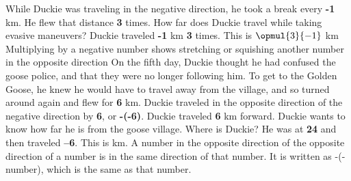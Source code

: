 {}
{While Duckie was traveling in the negative direction, he took a break every \textbf{-1} km. He flew that distance  \textbf{3} times. How far does Duckie travel while taking evasive maneuvers?}
{Duckie traveled \textbf{-1} km \textbf{3} times. This is $\opmul{3}{-1}$ km}
{Multiplying by a negative number shows stretching or squishing another number in the opposite direction}
{}
{On the fifth day, Duckie thought he had confused the goose police, and that they were no longer following him. To get to the Golden Goose, he knew he would have to travel away from the village, and so turned around again and flew for \textbf{6} km. Duckie traveled in the opposite direction of the negative direction by \textbf{6}, or \textbf{-(-6)}. Duckie traveled \textbf{6} km forward. Duckie wants to know how far he is from the goose village. Where is Duckie?}
{He was at \textbf{24} and then traveled \textbf{--6}. This is  km.}
{A number in the opposite direction of the opposite direction of a number is in the same direction of that number. It is written as -(-number), which is the same as  that number.}
{}

